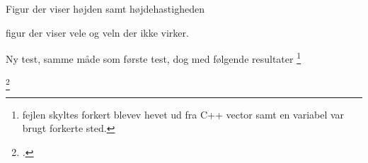

Figur der viser højden samt højdehastigheden

figur der viser vele og veln der ikke virker.

Ny test, samme måde som første test, dog med følgende resultater \footnote{fejlen skyltes forkert blevev hevet ud fra C++ vector samt en variabel var brugt forkerte sted.}

\footcite{kelddueholmmikkellaurentziusannab.o.jensen2015}




